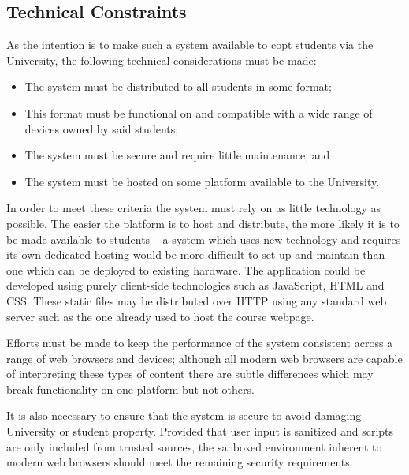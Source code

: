 \documentclass[bsc,twoside,singlespacing,parskip,logo,notimes,normalheadings]{infthesis}
\begin{document}
        \subsection{Technical Constraints}
        As the intention is to make such a system available to
        \gls{copt} students via the University, the following
        technical considerations must be made:

        \begin{itemize}
        \item The system must be distributed to all students in some
          format;
        \item This format must be functional on and compatible with a
          wide range of devices owned by said students;
        \item The system must be secure and require little
          maintenance; and
        \item The system must be hosted on some platform available to
          the University.
        \end{itemize}

        In order to meet these criteria the system must rely on as
        little technology as possible. The easier the platform is to
        host and distribute, the more likely it is to be made
        available to students -- a system which uses new technology
        and requires its own dedicated hosting would be more difficult
        to set up and maintain than one which can be deployed to
        existing hardware. The application could be developed using
        purely client-side technologies such as JavaScript, HTML and
        CSS. These static files may be distributed over HTTP using any
        standard web server such as the one already used to host the
        course webpage.

        Efforts must be made to keep the performance of the system
        consistent across a range of web browsers and devices;
        although all modern web browsers are capable of interpreting
        these types of content there are subtle differences which may
        break functionality on one platform but not others.

        It is also necessary to ensure that the system is secure to
        avoid damaging University or student property. Provided that
        user input is sanitized and scripts are only included from
        trusted sources, the sanboxed environment inherent to modern
        web browsers should meet the remaining security requirements.
\end{document}
